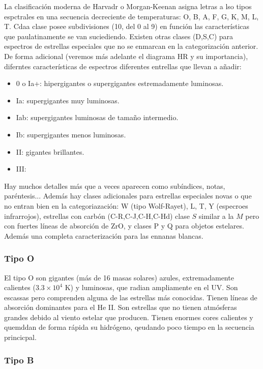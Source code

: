 La clasificación moderna de Harvadr o Morgan-Keenan asigna letras a lso tipos espctrales en una secuencia decreciente de temperaturas: O, B, A, F, G, K, M, L, T. Cdaa clase posee subdivisiones (10, del 0 al 9) en función las características que paulatinamente se van suciediendo. Existen otras clases (D,S,C) para espectros de estrellas especiales que no se enmarcan en la categorización anterior. De forma adicional (veremos más adelante el diagrama HR y su importancia), diferntes características de espectros diferentes entrellas que llevan a añadir:


\begin{itemize}
    \item 0 o Ia+: hipergigantes o supergigantes estremadamente luminosas.
    \item Ia: supergigantes muy luminosas.
    \item Iab: supergigantes luminosas de tamaño intermedio.
    \item Ib: supergigantes menos luminosas.
    \item II: gigantes brillantes.
    \item III:
\end{itemize}
Hay muchos detalles más que a veces aparecen como subíndices, notas, paréntesis...  Además hay clases adicionales para estrellas especiales novas o que no entran bien en la categoriazación: W (tipo Wolf-Rayet), L, T, Y (especroes infrarrojos), estrellas con carbón (C-R,C-J,C-H,C-Hd) clase $S$ similar a la $M$ pero con fuertes líneas de absorción de ZrO, y clases P y Q para objetos estelares. Además una completa caracterización para las ennanas blancas. 

\subsubsection{Tipo O}

El tipo O son gigantes (más de 16 masas solares) azules, extremadamente calientes ($3.3\times 10^4$ K) y luminosas, que radian ampliamente en el UV. Son escassas pero comprenden alguna de las estrellas más conocidas. Tienen líneas de absorción dominantes para el He II. Son estrellas que no tienen atmósferas grandes debido al viento estelar que producen. Tienen enormes cores calientes y quemddan de forma rápida su hidrógeno, qeudando poco tiempo en la secuencia princicpal.

\subsubsection{Tipo B}

